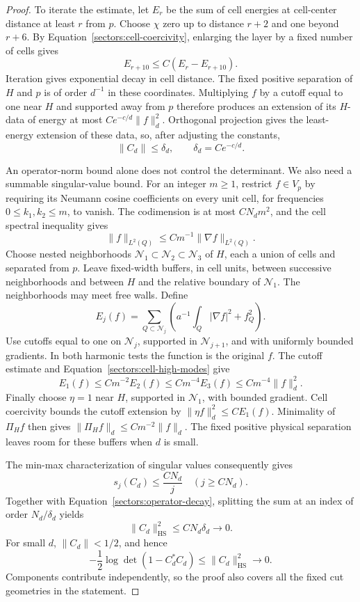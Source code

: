 \begin{proof}
To iterate the estimate, let \(E_r\) be the sum of cell energies at
cell-center distance at least \(r\) from \(p\). Choose \(\chi\) zero
up to distance \(r+2\) and one beyond \(r+6\).
By Equation~\eqref{sectors:cell-coercivity}, enlarging the layer by
a fixed number of cells gives
\[
 E_{r+10}\le C(E_r-E_{r+10}).
\]
Iteration gives exponential decay in cell distance. The fixed positive
separation of \(H\) and \(p\) is of order \(d^{-1}\) in these
coordinates. Multiplying \(f\) by a cutoff equal to one near \(H\)
and supported away from \(p\) therefore produces an extension of
its \(H\)-data of energy at most \(Ce^{-c/d}\|f\|_d^2\).
Orthogonal projection gives the least-energy extension of these data,
so, after adjusting the constants,
\begin{equation}
 \|C_d\|\le \delta_d,\qquad \delta_d=Ce^{-c/d}.
 \label{sectors:operator-decay}
\end{equation}

An operator-norm bound alone does not control the determinant.
We also need a summable singular-value bound. For an integer \(m\ge1\),
restrict \(f\in V_p\) by requiring its Neumann cosine coefficients
on every unit cell, for frequencies \(0\le k_1,k_2\le m\), to vanish.
The codimension is at most \(C N_dm^2\), and the cell spectral
inequality gives
\begin{equation}
 \|f\|_{L^2(Q)}\le C m^{-1}\|\nabla f\|_{L^2(Q)}.
 \label{sectors:cell-high-modes}
\end{equation}
Choose nested neighborhoods
\(\mathcal N_1\subset\mathcal N_2\subset\mathcal N_3\) of \(H\),
each a union of cells and separated from \(p\).
Leave fixed-width buffers, in cell units, between successive
neighborhoods and between \(H\) and the relative boundary of
\(\mathcal N_1\). The neighborhoods may meet free walls.
Define
\[
 E_j(f)=\sum_{Q\subset\mathcal N_j}
             \left(a^{-1}\int_Q|\nabla f|^2+f_Q^2\right).
\]
Use cutoffs equal to one on \(\mathcal N_j\), supported in
\(\mathcal N_{j+1}\), and with uniformly bounded gradients.
In both harmonic tests the function is the original \(f\).
The cutoff estimate and Equation~\eqref{sectors:cell-high-modes}
give
\[
 E_1(f)\le C m^{-2}E_2(f)
          \le C m^{-4}E_3(f)
          \le C m^{-4}\|f\|_d^2 .
\]
Finally choose \(\eta=1\) near \(H\), supported in
\(\mathcal N_1\), with bounded gradient. Cell coercivity bounds the
cutoff extension by \(\|\eta f\|_d^2\le C E_1(f)\).
Minimality of \(\Pi_Hf\) then gives
\(\|\Pi_Hf\|_d\le C m^{-2}\|f\|_d\).
The fixed positive physical separation leaves room for these
buffers when \(d\) is small.

The min-max characterization of singular values consequently gives
\[
 s_j(C_d)\le \frac{C N_d}{j}\quad (j\ge C N_d).
\]
Together with Equation~\eqref{sectors:operator-decay}, splitting the
sum at an index of order \(N_d/\delta_d\) yields
\[
 \|C_d\|_{\mathrm{HS}}^2
 \le C N_d\delta_d\longrightarrow0 .
\]
For small \(d\), \(\|C_d\|<1/2\), and hence
\[
 -\frac12\log\det(1-C_d^*C_d)
 \le \|C_d\|_{\mathrm{HS}}^2\longrightarrow0.
\]
Components contribute independently, so the proof also covers all
the fixed cut geometries in the statement.
\end{proof}


